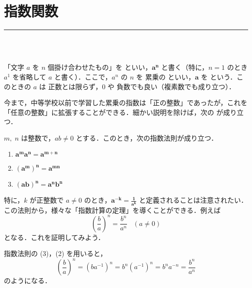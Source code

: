 \documentclass[b5paper,uplatex,dvipdfmx,fleqn]{jsarticle}
\theoremstyle{definition}
\begin{document}
\renewcommand{\postpartname}{講}

\part{指数関数}
\noindent
\hrule height 0.5pt depth 0.5pt width 10cm
\vspace{0.5cm}
\noindent
\colorbox{black}{\textcolor{white}{}}\vspace{0.4cm}\\
\vspace{0.2cm}\\
\setcounter{section}{1}
\vspace{0.2cm}

「文字 $a$ を $n$ 個掛け合わせたもの」を  といい，$\boldsymbol{a^{n}}$ と書く（特に，$n = 1$ のとき $a^{1}$ を省略して $a$ と書く）．ここで，$a^{n}$ の $n$ を 累乗の といい，$\boldsymbol{a}$ を  という．このときの $a$ は 正数とは限らず，$0$ や 負数でも良い（複素数でも成り立つ）．

今まで，中等学校以前で学習した累乗の指数は「正の整数」であったが，これを「任意の整数」に拡張することができる．細かい説明を除けば，次の  が成り立つ．\vspace{0.2cm}

\begin{tcolorbox}[title=\textgt{指数法則},sharp corners]
$m,\; n$ は整数で，$ab \neq 0$ とする．このとき，次の指数法則が成り立つ．
\begin{enumerate}
\item
$\boldsymbol{a^{m}a^{n} = a^{m + n}}$
\item
$\boldsymbol{(a^{m})^{n} = a^{mn}}$
\item
$\boldsymbol{(ab)^{n} = a^{n}b^{n}}$
\end{enumerate}
\end{tcolorbox}\vspace{0.2cm}

特に，$k$ が正整数で $a \neq 0$ のとき，$\displaystyle \boldsymbol{a^{-k} = \frac{1}{a^{k}}}$ と定義されることは注意されたい．\\

この法則から，様々な「指数計算の定理」を導くことができる．例えば
\[
\left( \frac{b}{a} \right)^{n} = \frac{b^{n}}{a^{n}}\;\;\; (a \neq 0)
\]
となる．これを証明してみよう．

指数法則の (3)，(2) を用いると，
\[
\left( \frac{b}{a} \right)^{n} = (ba^{-1})^{n} = b^{n}(a^{-1})^{n} = b^{n}a^{-n} = \frac{b^{n}}{a^{n}}
\]
のようになる．
\end{document}
